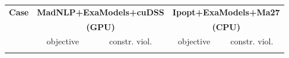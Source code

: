 \documentclass{standalone}
\begin{document}
\centering
\begin{tabular}{|l|cc|cc|}
  \hline
  \multirow{3}{*}{\textbf{Case}}
  & \multicolumn{2}{c|}{\textbf{MadNLP+ExaModels+cuDSS}}
  & \multicolumn{2}{c|}{\textbf{Ipopt+ExaModels+Ma27}}\\
  &\multicolumn{2}{c|}{\textbf{(GPU)}} &\multicolumn{2}{c|}{\textbf{(CPU)}} 
  \\
  \cline{2-5}
  & objective & constr. viol.
  & objective & constr. viol.
  \\
  \\
  \hline
\end{tabular}
\end{document}
